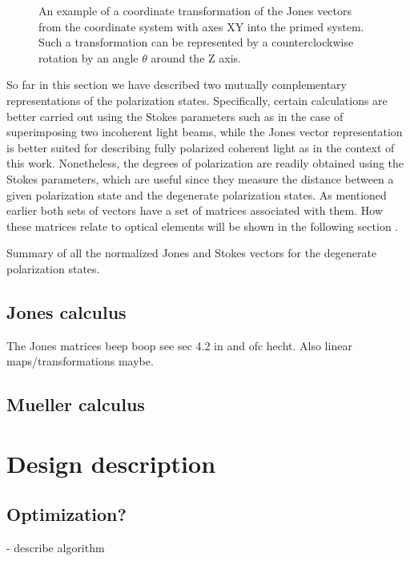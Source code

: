 \begin{figure}[h]
    \centering
    
    \caption{An example of a coordinate transformation of the Jones vectors from the coordinate system with axes XY into the primed system. Such a transformation can be represented by a counterclockwise rotation by an angle $\theta$ around the Z axis.}
    \label{fig:frame_rotation}
\end{figure}

So far in this section we have described two mutually complementary representations of the polarization states. Specifically, certain calculations are better carried out using the Stokes parameters such as in the case of superimposing two incoherent light beams, while the Jones vector representation is better suited for describing fully polarized coherent light as in the context of this work. Nonetheless, the degrees of polarization are readily obtained using the Stokes parameters, which are useful since they measure the distance between a given polarization state and the degenerate polarization states. As mentioned earlier both sets of vectors have a set of matrices associated with them. How these matrices relate to optical elements will be shown in the following section \cite{HechtOpticsEdition, GilPerez2017PolarizedApproach}.

\begin{table}[h]
    \centering
    
    \caption{Summary of all the normalized Jones and Stokes vectors for the degenerate polarization states.}
    \label{tab:pol_statevectors}
\end{table}

\subsection{Jones calculus}
\label{sec:jonescalc}
The Jones matrices beep boop
see sec 4.2 in \cite{GilPerez2017PolarizedApproach} and ofc hecht. Also linear maps/transformations maybe.

\subsection{Mueller calculus}
\label{sec:muellercalc}

\section{Design description}
\label{sec:design}

\subsection{Optimization?}
- describe algorithm
